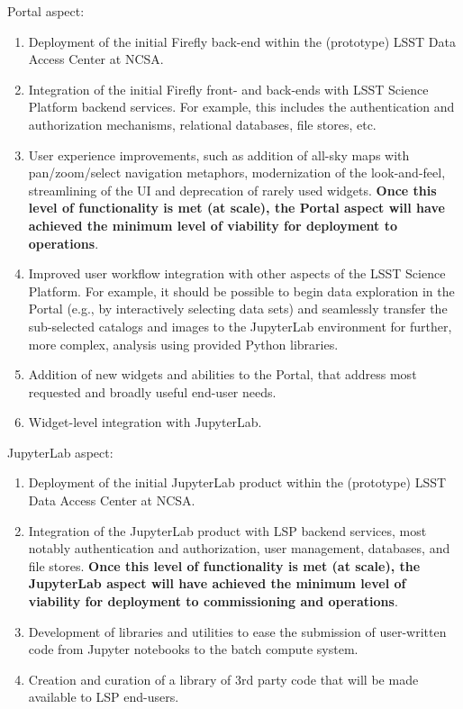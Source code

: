 \documentclass[DM,lsstdraft,toc]{lsstdoc}
\begin{document}
Portal aspect:
\begin{enumerate}
	\item Deployment of the initial Firefly back-end within the (prototype) LSST Data Access Center at NCSA.
	\item Integration of the initial Firefly front- and back-ends with LSST Science Platform backend services. For example, this includes the authentication and authorization mechanisms, relational databases, file stores, etc.
	\item User experience improvements, such as addition of all-sky maps with pan/zoom/select navigation metaphors, modernization of the look-and-feel, streamlining of the UI and deprecation of rarely used widgets. {\bf Once this level of functionality is met (at scale), the Portal aspect will have achieved the minimum level of viability for deployment to operations}.
	\item Improved user workflow integration with other aspects of the LSST Science Platform. For example, it should be possible to begin data exploration in the Portal (e.g., by interactively selecting data sets) and seamlessly transfer the sub-selected catalogs and images to the JupyterLab environment for further, more complex, analysis using provided Python libraries.
	\item Addition of new widgets and abilities to the Portal, that address most requested and broadly useful end-user needs.
	\item Widget-level integration with JupyterLab.
\end{enumerate}

JupyterLab aspect:
\begin{enumerate}
	\item Deployment of the initial JupyterLab product within the (prototype) LSST Data Access Center at NCSA.
	\item Integration of the JupyterLab product with LSP backend services, most notably authentication and authorization, user management, databases, and file stores. {\bf Once this level of functionality is met (at scale), the JupyterLab aspect will have achieved the minimum level of viability for deployment to commissioning and operations}.
	\item Development of libraries and utilities to ease the submission of user-written code from Jupyter notebooks to the batch compute system.
	\item Creation and curation of a library of 3rd party code that will be made available to LSP end-users.
\end{enumerate}
\end{document}
